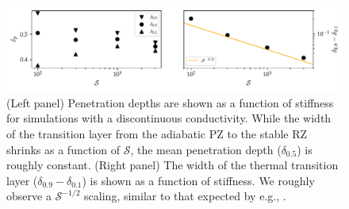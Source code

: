 \documentclass[twocolumn]{aastex631}
\newcommand{\mP}{\ensuremath{\mathcal{P}}}
\newcommand{\mR}{\ensuremath{\mathcal{R}}}
\newcommand{\mS}{\ensuremath{\mathcal{S}}}
\begin{document}

\begin{figure}[t]
\centering
\includegraphics{parameters_vs_s.pdf}
\caption{
(Left panel) Penetration depths are shown as a function of stiffness for simulations with a discontinuous conductivity.
While the width of the transition layer from the adiabatic PZ to the stable RZ shrinks as a function of $\mS$, the mean penetration depth ($\delta_{0.5}$) is roughly constant.
(Right panel) The width of the thermal transition layer ($\delta_{0.9} - \delta_{0.1}$) is shown as a function of stiffness.
We roughly observe a $\mS^{-1/2}$ scaling, similar to that expected by e.g., \citet{korre_etal_2019}.
\label{fig:parameters_vs_s}
}
\end{figure}
\end{document}
